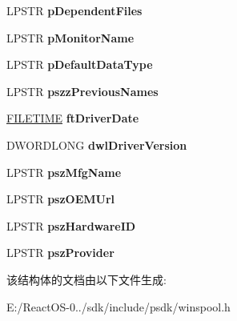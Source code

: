 \begin{DoxyCompactItemize}
L\+P\+S\+TR {\bfseries p\+Dependent\+Files}
\item 
\mbox{\label{struct___d_r_i_v_e_r___i_n_f_o__6_a_adbf640db7aeefb66307a460296c871f9}} 
L\+P\+S\+TR {\bfseries p\+Monitor\+Name}
\item 
\mbox{\label{struct___d_r_i_v_e_r___i_n_f_o__6_a_ad0f9dbb783d7e92cda8e6bf6889aa1c5}} 
L\+P\+S\+TR {\bfseries p\+Default\+Data\+Type}
\item 
\mbox{\label{struct___d_r_i_v_e_r___i_n_f_o__6_a_a017e54aaea1f093f9aba9253a353296f}} 
L\+P\+S\+TR {\bfseries pszz\+Previous\+Names}
\item 
\mbox{\label{struct___d_r_i_v_e_r___i_n_f_o__6_a_a6b7fa947e655c2398de09cb5af568bc5}} 
\hyperlink{struct___f_i_l_e_t_i_m_e}{F\+I\+L\+E\+T\+I\+ME} {\bfseries ft\+Driver\+Date}
\item 
\mbox{\label{struct___d_r_i_v_e_r___i_n_f_o__6_a_a73c597e8817ee97c185f87dbe46663fc}} 
D\+W\+O\+R\+D\+L\+O\+NG {\bfseries dwl\+Driver\+Version}
\item 
\mbox{\label{struct___d_r_i_v_e_r___i_n_f_o__6_a_a61efe1f539d644e6a62b78a10171679e}} 
L\+P\+S\+TR {\bfseries psz\+Mfg\+Name}
\item 
\mbox{\label{struct___d_r_i_v_e_r___i_n_f_o__6_a_a32f7aba605f29dcabdfa5ff33858e82f}} 
L\+P\+S\+TR {\bfseries psz\+O\+E\+M\+Url}
\item 
\mbox{\label{struct___d_r_i_v_e_r___i_n_f_o__6_a_a687a3cf10242bda3e13cc0a7ccf294c6}} 
L\+P\+S\+TR {\bfseries psz\+Hardware\+ID}
\item 
\mbox{\label{struct___d_r_i_v_e_r___i_n_f_o__6_a_af93238ce449dbb9fe295b472001c7e53}} 
L\+P\+S\+TR {\bfseries psz\+Provider}
\end{DoxyCompactItemize}


该结构体的文档由以下文件生成\+:\begin{DoxyCompactItemize}
\item 
E\+:/\+React\+O\+S-\/0../sdk/include/psdk/winspool.\+h\end{DoxyCompactItemize}
